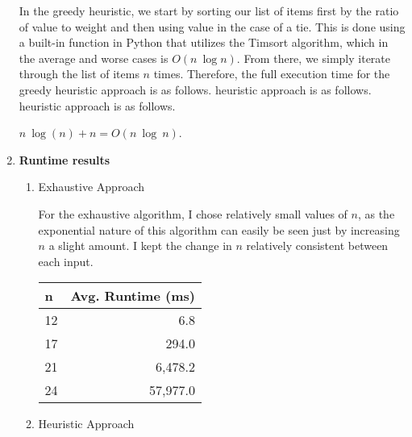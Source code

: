 \documentclass[12pt]{article}
\begin{document}
\begin{enumerate}
          In the greedy heuristic, we start by sorting our list of items
          first by the ratio of value to weight and then using value in the case of a tie.
          This is done using a built-in function in Python that utilizes the Timsort algorithm,
          which in the average and worse cases is $O(n\ \log n)$. From there, we simply iterate
          through the list of items $n$ times. Therefore, the full execution time for the greedy
          heuristic approach is as follows. 
          heuristic approach is as follows. 
          heuristic approach is as follows. 
          
          \begin{center}
              $n\ \log(n) + n = O(n\ \log\ n)$.
          \end{center}
          \pagebreak
    \item \textbf{Runtime results}
          \begin{enumerate}
              \item Exhaustive Approach
                    
                    For the exhaustive algorithm, I chose relatively small values of $n$,
                    as the exponential nature of this algorithm can easily be seen
                    just by increasing $n$ a slight amount. I kept the change in $n$
                    relatively consistent between each input.
                    
                    \begin{center}
                        \begin{tabular}{ |l |r |}
                            \hline
                            \textbf{n} & \textbf{Avg. Runtime (ms)} \\
                            \hline
                            12         & 6.8                        \\
                            17         & 294.0                      \\
                            21         & 6,478.2                    \\
                            24         & 57,977.0                   \\
                            \hline
                        \end{tabular}
                    \end{center}
              \item Heuristic Approach
                    

\end{enumerate}
\end{enumerate}
\end{document}
